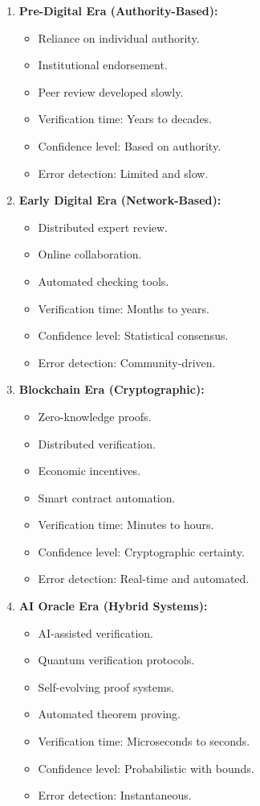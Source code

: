 \documentclass[11pt]{article}
\begin{document}
\begin{enumerate}[label=(\arabic*)]
    \item \textbf{Pre-Digital Era (Authority-Based):}
    \begin{itemize}
        \item Reliance on individual authority.
        \item Institutional endorsement.
        \item Peer review developed slowly.
        \item Verification time: Years to decades.
        \item Confidence level: Based on authority.
        \item Error detection: Limited and slow.
    \end{itemize}
    \item \textbf{Early Digital Era (Network-Based):}
    \begin{itemize}
        \item Distributed expert review.
        \item Online collaboration.
        \item Automated checking tools.
        \item Verification time: Months to years.
        \item Confidence level: Statistical consensus.
        \item Error detection: Community-driven.
    \end{itemize}
    \item \textbf{Blockchain Era (Cryptographic):}
    \begin{itemize}
        \item Zero-knowledge proofs.
        \item Distributed verification.
        \item Economic incentives.
        \item Smart contract automation.
        \item Verification time: Minutes to hours.
        \item Confidence level: Cryptographic certainty.
        \item Error detection: Real-time and automated.
    \end{itemize}
    \item \textbf{AI Oracle Era (Hybrid Systems):}
    \begin{itemize}
        \item AI-assisted verification.
        \item Quantum verification protocols.
        \item Self-evolving proof systems.
        \item Automated theorem proving.
        \item Verification time: Microseconds to seconds.
        \item Confidence level: Probabilistic with bounds.
        \item Error detection: Instantaneous.
    \end{itemize}
\end{enumerate}
\end{document}
